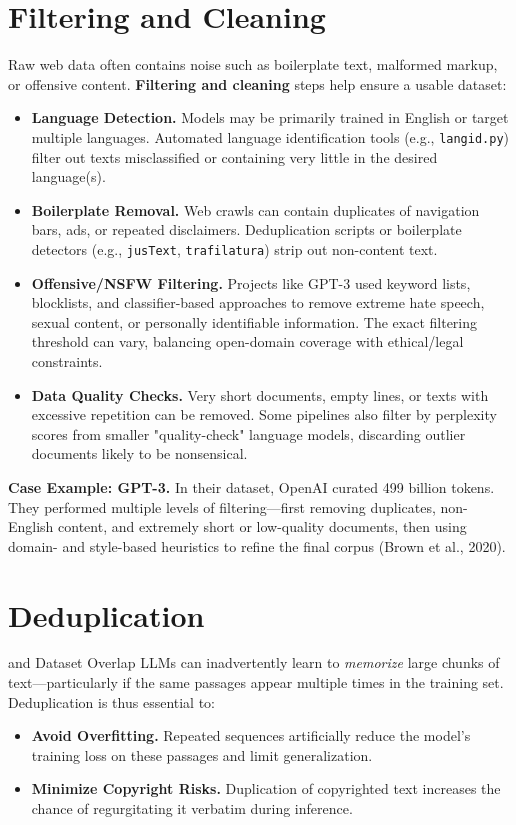 \section{Filtering and Cleaning}
\noindent
Raw web data often contains noise such as boilerplate text, malformed markup, or offensive content. \textbf{Filtering and cleaning} steps help ensure a usable dataset:
\begin{itemize}
    \item \textbf{Language Detection.} Models may be primarily trained in English or target multiple languages. Automated language identification tools (e.g., \texttt{langid.py}) filter out texts misclassified or containing very little in the desired language(s).
    \item \textbf{Boilerplate Removal.} Web crawls can contain duplicates of navigation bars, ads, or repeated disclaimers. Deduplication scripts or boilerplate detectors (e.g., \texttt{jusText}, \texttt{trafilatura}) strip out non-content text.
    \item \textbf{Offensive/NSFW Filtering.} Projects like GPT-3 used keyword lists, blocklists, and classifier-based approaches to remove extreme hate speech, sexual content, or personally identifiable information. The exact filtering threshold can vary, balancing open-domain coverage with ethical/legal constraints.
    \item \textbf{Data Quality Checks.} Very short documents, empty lines, or texts with excessive repetition can be removed. Some pipelines also filter by perplexity scores from smaller "quality-check" language models, discarding outlier documents likely to be nonsensical.
\end{itemize}

\noindent
\textbf{Case Example: GPT-3.}  
In their dataset, OpenAI curated 499 billion tokens. They performed multiple levels of filtering—first removing duplicates, non-English content, and extremely short or low-quality documents, then using domain- and style-based heuristics to refine the final corpus (Brown et al., 2020).

\section{Deduplication} and Dataset Overlap
\noindent
LLMs can inadvertently learn to \emph{memorize} large chunks of text—particularly if the same passages appear multiple times in the training set. Deduplication is thus essential to:
\begin{itemize}
    \item \textbf{Avoid Overfitting.} Repeated sequences artificially reduce the model's training loss on these passages and limit generalization.
    \item \textbf{Minimize Copyright Risks.} Duplication of copyrighted text increases the chance of regurgitating it verbatim during inference.
\end{itemize}

